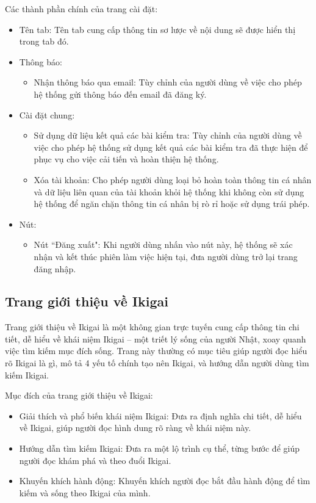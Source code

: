 Các thành phần chính của trang cài đặt:
\begin{itemize}
    \item Tên tab: Tên tab cung cấp thông tin sơ lược về nội dung sẽ được hiển thị trong tab đó.
    \item Thông báo:
        \begin{itemize}
            \item Nhận thông báo qua email: Tùy chỉnh của người dùng về việc cho phép hệ thống gửi thông báo đến email đã đăng ký. 
        \end{itemize}
    \item Cài đặt chung:
        \begin{itemize}
            \item Sử dụng dữ liệu kết quả các bài kiểm tra: Tùy chỉnh của người dùng về việc cho phép hệ thống sử dụng kết quả các bài kiểm tra đã thực hiện để phục vụ cho việc cải tiến và hoàn thiện hệ thống.
            \item Xóa tài khoản: Cho phép người dùng loại bỏ hoàn toàn thông tin cá nhân và dữ liệu liên quan của tài khoản khỏi hệ thống khi không còn sử dụng hệ thống để ngăn chặn thông tin cá nhân bị rò rỉ hoặc sử dụng trái phép.
        \end{itemize}
    \item Nút:
        \begin{itemize}
            \item Nút ``Đăng xuất": Khi người dùng nhấn vào nút này, hệ thống sẽ xác nhận và kết thúc phiên làm việc hiện tại, đưa người dùng trở lại trang đăng nhập.
        \end{itemize}
\end{itemize}


\subsection{Trang giới thiệu về Ikigai}
Trang giới thiệu về Ikigai là một không gian trực tuyến cung cấp thông tin chi tiết, dễ hiểu về khái niệm Ikigai – một triết lý sống của người Nhật, xoay quanh việc tìm kiếm mục đích sống. Trang này thường có mục tiêu giúp người đọc hiểu rõ Ikigai là gì, mô tả 4 yếu tố chính tạo nên Ikigai, và hướng dẫn người dùng tìm kiếm Ikigai.

Mục đích của trang giới thiệu về Ikigai:
\begin{itemize}
    \item Giải thích và phổ biến khái niệm Ikigai: Đưa ra định nghĩa chi tiết, dễ hiểu về Ikigai, giúp người đọc hình dung rõ ràng về khái niệm này.
    \item Hướng dẫn tìm kiếm Ikigai: Đưa ra một lộ trình cụ thể, từng bước để giúp người đọc khám phá và theo đuổi Ikigai.
    \item Khuyến khích hành động: Khuyến khích người đọc bắt đầu hành động để tìm kiếm và sống theo Ikigai của mình.
\end{itemize}


